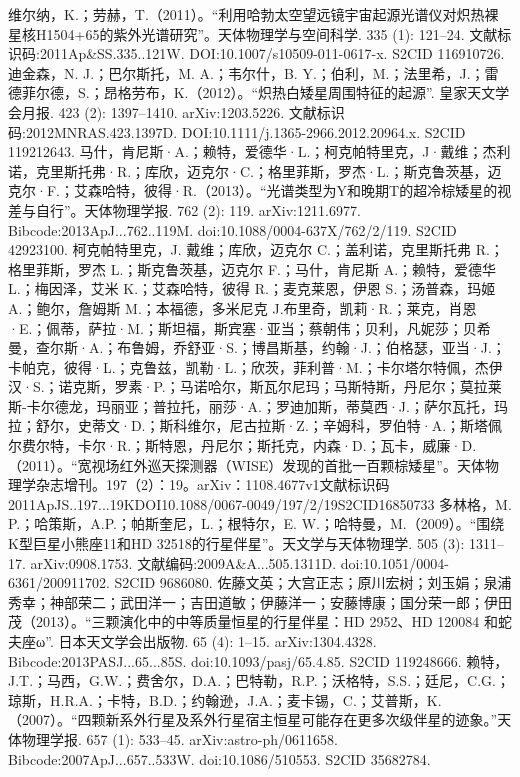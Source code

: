 \begin{enumerate}
 维尔纳，K.；劳赫，T.（2011）。“利用哈勃太空望远镜宇宙起源光谱仪对炽热裸星核H1504+65的紫外光谱研究”。天体物理学与空间科学. 335 (1): 121–24. 文献标识码:2011Ap&SS.335..121W. DOI:10.1007/s10509-011-0617-x. S2CID 116910726.
 迪金森，N. J.；巴尔斯托，M. A.；韦尔什，B. Y.；伯利，M.；法里希，J.；雷德菲尔德，S.；昂格劳布，K.（2012）。“炽热白矮星周围特征的起源”. 皇家天文学会月报. 423 (2): 1397–1410. arXiv:1203.5226. 文献标识码:2012MNRAS.423.1397D. DOI:10.1111/j.1365-2966.2012.20964.x. S2CID 119212643.
 马什，肯尼斯·A.；赖特，爱德华·L.；柯克帕特里克，J·戴维；杰利诺，克里斯托弗·R.；库欣，迈克尔·C.；格里菲斯，罗杰·L.；斯克鲁茨基，迈克尔·F.；艾森哈特，彼得·R.（2013）。“光谱类型为Y和晚期T的超冷棕矮星的视差与自行”。天体物理学报. 762 (2): 119. arXiv:1211.6977. Bibcode:2013ApJ...762..119M. doi:10.1088/0004-637X/762/2/119. S2CID 42923100.
 柯克帕特里克，J. 戴维；库欣，迈克尔 C.；盖利诺，克里斯托弗 R.；格里菲斯，罗杰 L.；斯克鲁茨基，迈克尔 F.；马什，肯尼斯 A.；赖特，爱德华 L.；梅因泽，艾米 K.；艾森哈特，彼得 R.；麦克莱恩，伊恩 S.；汤普森，玛姬 A.；鲍尔，詹姆斯 M.；本福德，多米尼克 J.布里奇，凯莉·R.；莱克，肖恩·E.；佩蒂，萨拉·M.；斯坦福，斯宾塞·亚当；蔡朝伟；贝利，凡妮莎；贝希曼，查尔斯·A.；布鲁姆，乔舒亚·S.；博昌斯基，约翰·J.；伯格瑟，亚当·J.；卡帕克，彼得·L.；克鲁兹，凯勒·L.；欣茨，菲利普·M.；卡尔塔尔特佩，杰伊汉·S.；诺克斯，罗素·P.；马诺哈尔，斯瓦尔尼玛；马斯特斯，丹尼尔；莫拉莱斯-卡尔德龙，玛丽亚；普拉托，丽莎·A.；罗迪加斯，蒂莫西·J.；萨尔瓦托，玛拉；舒尔，史蒂文·D.；斯科维尔，尼古拉斯·Z.；辛姆科，罗伯特·A.；斯塔佩尔费尔特，卡尔·R.；斯特恩，丹尼尔；斯托克，内森·D.；瓦卡，威廉·D. （2011）。“宽视场红外巡天探测器（WISE）发现的首批一百颗棕矮星”。天体物理学杂志增刊。197（2）：19。arXiv：1108.4677v1文献标识码2011ApJS..197...19KDOI10.1088/0067-0049/197/2/19S2CID16850733
 多林格，M. P.；哈策斯，A.P.；帕斯奎尼，L.；根特尔，E. W.；哈特曼，M.（2009）。“围绕K型巨星小熊座11和HD 32518的行星伴星”。天文学与天体物理学. 505 (3): 1311–17. arXiv:0908.1753. 文献编码:2009A&A...505.1311D. doi:10.1051/0004-6361/200911702. S2CID 9686080.
 佐藤文英；大宫正志；原川宏树；刘玉娟；泉浦秀幸；神部荣二；武田洋一；吉田道敏；伊藤洋一；安藤博康；国分荣一郎；伊田茂（2013）。“三颗演化中的中等质量恒星的行星伴星：HD 2952、HD 120084 和蛇夫座ω”. 日本天文学会出版物. 65 (4): 1–15. arXiv:1304.4328. Bibcode:2013PASJ...65...85S. doi:10.1093/pasj/65.4.85. S2CID 119248666.
 赖特，J.T.；马西，G.W.；费舍尔，D.A.；巴特勒，R.P.；沃格特，S.S.；廷尼，C.G.；琼斯，H.R.A.；卡特，B.D.；约翰逊，J.A.；麦卡锡，C.；艾普斯，K.（2007）。“四颗新系外行星及系外行星宿主恒星可能存在更多次级伴星的迹象。”天体物理学报. 657 (1): 533–45. arXiv:astro-ph/0611658. Bibcode:2007ApJ...657..533W. doi:10.1086/510553. S2CID 35682784.

\end{enumerate}
